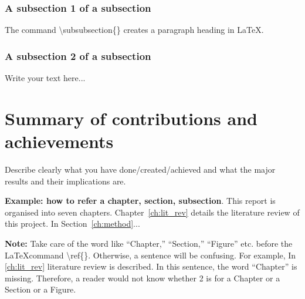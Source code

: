 \subsubsection{A subsection 1 of a subsection}
\label{sec:intro_some_subsub1}
The command \textbackslash subsubsection\{\} creates a paragraph heading in \LaTeX.

\subsubsection{A subsection 2 of a subsection}
\label{sec:intro_some_subsub2}
Write your text here...

\section{Summary of contributions and achievements} %
\label{sec:intro_sum_results} %
Describe clearly what you have done/created/achieved and what the major results and their implications are. 




\textbf{Example: how to refer a chapter, section, subsection}. This report is organised into seven chapters. Chapter~\ref{ch:lit_rev} details the literature review of this project. In Section~\ref{ch:method}...  %

\textbf{Note:}  Take care of the word like ``Chapter,'' ``Section,'' ``Figure'' etc. before the \LaTeX command \textbackslash ref\{\}. Otherwise, a  sentence will be confusing. For example, In \ref{ch:lit_rev} literature review is described. In this sentence, the word ``Chapter'' is missing. Therefore, a reader would not know whether 2 is for a Chapter or a Section or a Figure.